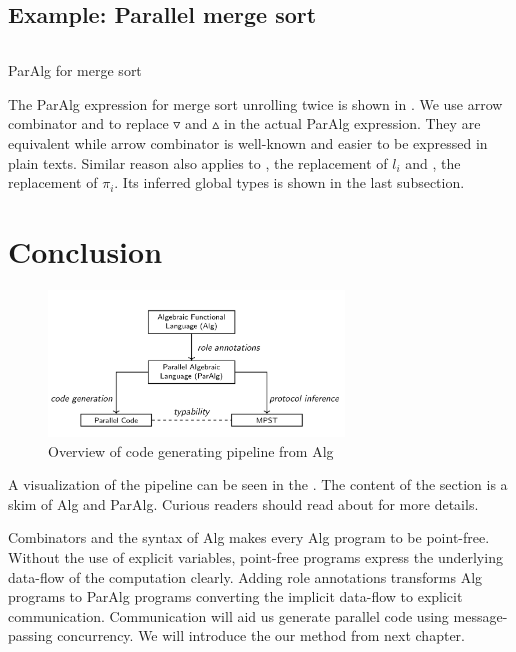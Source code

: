 \subsection{Example: Parallel merge sort}
\begin{listing}[ht]
\inputminted{text}{project/ms.txt}
\caption{ParAlg for merge sort}
\label{project:code:mspar}
\end{listing}
The ParAlg expression for merge sort unrolling twice is shown in . We use arrow combinator \hask{&&&} and \hask{|||} to replace $\triangledown$ and $\vartriangle$ in the actual ParAlg expression. They are equivalent while arrow combinator is well-known and easier to be expressed in plain texts. Similar reason also applies to , the replacement of $l_i$ and , the replacement of $\pi_i$. Its inferred global types is shown in the last subsection.

\section{Conclusion}
\begin{figure}[ht]
    \centering
    \includegraphics[width=0.7\textwidth]{project/pipeline.png}
    \caption{Overview of code generating pipeline from Alg\cite{AlgebraicMultipartyProtocol}}
    \label{project:fig:pipeline}
\end{figure}
A visualization of the pipeline can be seen in the . The content of the section is a skim of Alg and ParAlg. Curious readers should read about \cite{AlgebraicMultipartyProtocol} for more details.

Combinators and the syntax of Alg makes every Alg program to be point-free. Without the use of explicit variables, point-free programs express the underlying data-flow of the computation clearly. Adding role annotations transforms Alg programs to ParAlg programs converting the implicit data-flow to explicit communication. Communication will aid us generate parallel code using message-passing concurrency. We will introduce the our method from next chapter.  